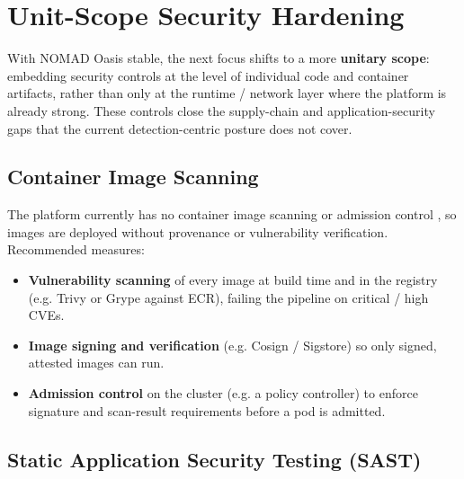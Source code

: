 \documentclass[11pt,a4paper]{report}
\begin{document}
\noindent{}

\chapter{Unit-Scope Security Hardening}

With NOMAD Oasis stable, the next focus shifts to a more \textbf{unitary scope}:
embedding security controls at the level of individual code and container
artifacts, rather than only at the runtime / network layer where the platform is
already strong. These controls close the supply-chain and application-security
gaps that the current detection-centric posture does not cover.

\section{Container Image Scanning}

The platform currently has no container image scanning or admission control
, so images are deployed without provenance or vulnerability
verification. Recommended measures:

\begin{itemize}[leftmargin=*]
    \item \textbf{Vulnerability scanning} of every image at build time and in the
          registry (e.g. Trivy or Grype against ECR), failing the pipeline on
          critical / high CVEs.
    \item \textbf{Image signing and verification} (e.g. Cosign / Sigstore) so only
          signed, attested images can run.
    \item \textbf{Admission control} on the cluster (e.g. a policy controller) to
          enforce signature and scan-result requirements before a pod is admitted.
\end{itemize}

\section{Static Application Security Testing (SAST)}
\end{document}
